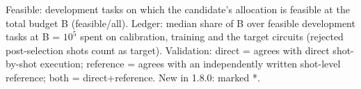 \begin{table}[p]
\begin{tabular}{lllrrrrrr}
\bottomrule
\end{tabular}
\par\vspace{0.5em}
\begin{minipage}{0.97\linewidth}
\footnotesize Feasible: development tasks on which the candidate's allocation is feasible at the total budget B (feasible/all). Ledger: median share of B over feasible development tasks at B = $10^{5}$ spent on calibration, training and the target circuits (rejected post-selection shots count as target). Validation: direct = agrees with direct shot-by-shot execution; reference = agrees with an independently written shot-level reference; both = direct+reference. New in 1.8.0: marked *.
\end{minipage}
\end{table}
